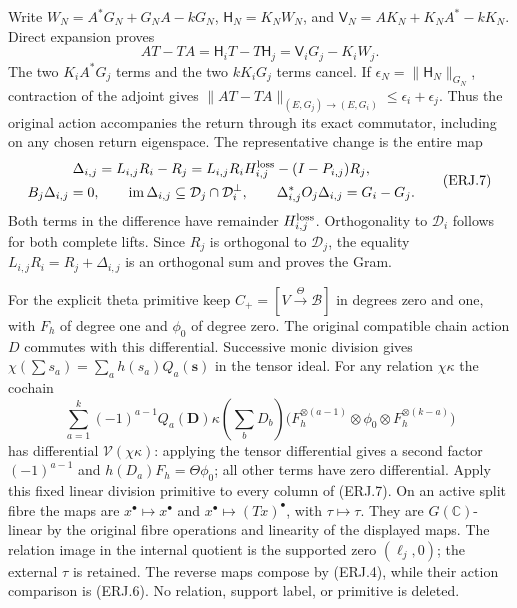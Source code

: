 \documentclass[11pt]{article}
\newcommand{\C}{\mathbb C}\newcommand{\R}{\mathbb R}
\begin{document}
Write $W_N=A^*G_N+G_NA-kG_N$,
$\mathsf H_N=K_NW_N$, and
$\mathsf V_N=AK_N+K_NA^*-kK_N$. Direct expansion proves
\[
 AT-TA=\mathsf H_iT-T\mathsf H_j
       =\mathsf V_iG_j-K_iW_j.\tag{ERJ.6}
\]
The two $K_iA^*G_j$ terms and the two $kK_iG_j$ terms cancel.
If $\epsilon_N=\|\mathsf H_N\|_{G_N}$, contraction of the adjoint
gives $\|AT-TA\|_{(E,G_j)\to(E,G_i)}\le\epsilon_i+\epsilon_j$.
Thus the original action accompanies the return through its exact
commutator, including on any chosen return eigenspace.
The representative change is the entire map
\[
\begin{gathered}
 \Delta_{i,j}=L_{i,j}R_i-R_j
 =L_{i,j}R_iH_{i,j}^{\rm loss}-(I-P_{i,j})R_j,\\
 B_j\Delta_{i,j}=0,\qquad
 \operatorname{im}\Delta_{i,j}\subseteq\mathcal D_j\cap\mathcal D_i^\perp,
 \qquad \Delta_{i,j}^*O_j\Delta_{i,j}=G_i-G_j.
\end{gathered}\tag{ERJ.7}
\]
Both terms in the difference have remainder $H_{i,j}^{\rm loss}$.
Orthogonality to $\mathcal D_i$ follows for both complete lifts.
Since $R_j$ is orthogonal to $\mathcal D_j$, the equality
$L_{i,j}R_i=R_j+\Delta_{i,j}$ is an orthogonal sum and proves the Gram.

For the explicit theta primitive keep
$C_+=[V\xrightarrow{\Theta}\mathscr B]$ in degrees zero and one,
with $F_h$ of degree one and $\phi_0$ of degree zero. The original
compatible chain action $D$ commutes with this differential.
Successive monic division gives
$\chi(\sum s_a)=\sum_a h(s_a)Q_a(\mathbf s)$ in the tensor ideal.
For any relation $\chi\kappa$ the cochain
\[
 \sum_{a=1}^k(-1)^{a-1}Q_a(\mathbf D)\kappa(\textstyle\sum_bD_b)
 \bigl(F_h^{\otimes(a-1)}\otimes\phi_0
                    \otimes F_h^{\otimes(k-a)}\bigr)\tag{ERJ.8}
\]
has differential $\mathcal V(\chi\kappa)$: applying the tensor
differential gives a second factor $(-1)^{a-1}$ and
$h(D_a)F_h=\Theta\phi_0$; all other terms have zero differential.
Apply this fixed linear division primitive to every column of (ERJ.7).
On an active split fibre the maps are $x^\bullet\mapsto x^\bullet$
and $x^\bullet\mapsto(Tx)^\bullet$, with $\tau\mapsto\tau$.
They are $G(\C)$-linear by the original fibre operations and linearity
of the displayed maps. The relation image in the internal quotient is
the supported zero $(\ell_j,0)$; the external $\tau$ is retained.
The reverse maps compose by (ERJ.4), while their action comparison
is (ERJ.6). No relation, support label, or primitive is deleted.
\end{document}
